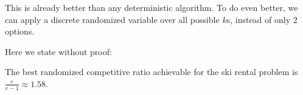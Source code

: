 This is already better than any deterministic algorithm. To do even better, we can apply a discrete randomized variable over all possible $k$s, instead of only 2 options.

Here we state without proof:

\begin{theorem}
	The best randomized competitive ratio achievable for the ski rental problem is $\frac{e}{e-1} \approx 1.58$.
\end{theorem}
